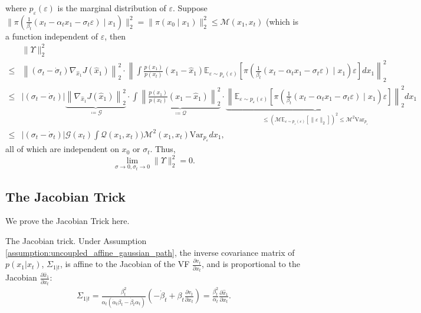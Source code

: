 where $p_\varepsilon(\varepsilon)$ is the marginal distribution of $\varepsilon$.
Suppose $\|\pi\left(\frac{1}{\beta_t}(x_t - \alpha_t x_1 - \sigma_t \varepsilon)\mid x_1\right)\|^2_2 = \|\pi\left(x_0 \mid x_1\right)\|^2_2\le \mathcal{M}(x_1,x_t)$ (which is a function independent of $\varepsilon$, then
\begin{align}
    \nonumber &\|\Upsilon\|^2_2 \\
    \nonumber \le& \left\|(\sigma_t - \dot\sigma_t)\nabla_{\hat{x}_1}J(\hat{x}_1)\right\|_2^2\cdot \left\|\int\frac{p(x_1)}{p(x_t)}(x_1-\hat{x}_1)\mathbb{E}_{\varepsilon\sim p_\varepsilon(\varepsilon)}
    \left[{\pi\left(\frac{1}{\beta_t}(x_t - \alpha_t x_1 - \sigma_t \varepsilon)\mid x_1\right)} \varepsilon \right]dx_1\right\|^2_2 \\
    \nonumber \le& |(\sigma_t - \dot\sigma_t)|\underbrace{\left\|\nabla_{\hat{x}_1}J(\hat{x}_1)\right\|_2^2}_{\coloneqq \mathcal{G}}\cdot \int
    \underbrace{\left\|\frac{p(x_1)}{p(x_t)}(x_1-\hat{x}_1)\right\|^2_2}_{\coloneqq\mathcal{Q}}
    \cdot
    \underbrace{\left\|\mathbb{E}_{\varepsilon\sim p_\varepsilon(\varepsilon)}
    \left[{\pi\left(\frac{1}{\beta_t}(x_t - \alpha_t x_1 - \sigma_t \varepsilon)\mid x_1\right)} \varepsilon \right]\right\|^2_2}_{\le \left(\mathcal{M}\mathbb{E}_{\varepsilon\sim p_\varepsilon(\varepsilon)}[\|\varepsilon\|_2]\right)^2 \le \mathcal{M}^2 \text{Var}_{p_\varepsilon}}dx_1 \\
    \le& |(\sigma_t - \dot\sigma_t)|\mathcal{G}(x_t)\int \mathcal{Q}(x_1,x_t))\mathcal{M}^2(x_1,x_t)\text{Var}_{p_\varepsilon} dx_1,
\end{align}
all of which are independent on $x_0$ or $\sigma_t$. Thus, 
\begin{equation}
    \lim_{\sigma\rightarrow 0,\sigma_t\rightarrow 0}\|\Upsilon\|^2_2 = 0.
\end{equation}


\subsection{The Jacobian Trick}\label{appendix:jacobian_trick}
We prove the Jacobian Trick here. 
\begin{proposition} The Jacobian trick. Under Assumption \ref{assumption:uncoupled_affine_gaussian_path}, the inverse covariance matrix of $p(x_1|x_t)$, $\Sigma_{1|t}$, is affine to the Jacobian of the VF $\frac{\partial v_t}{\partial x_t}$, and is proportional to the Jacobian $\frac{\partial \hat{x}_1}{\partial x_t}$:
\begin{align}\nonumber
     \Sigma_{1|t}= \frac{\beta_t^2}{\alpha_t(\dot\alpha_t\beta_t - \dot\beta_t\alpha_t)} (-\dot\beta_t+ \beta_t\frac{\partial v_t}{\partial x_t} )
     = \frac{\beta_t^2}{\alpha_t} \frac{\partial \hat{x}_1}{\partial x_t}.
\end{align}
\end{proposition}

